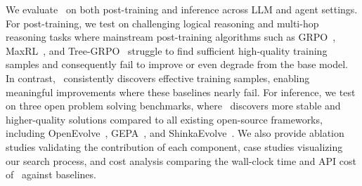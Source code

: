 We evaluate \ours\ on both post-training and inference across LLM and agent settings. For post-training, we test on challenging logical reasoning and multi-hop reasoning tasks where mainstream post-training algorithms such as GRPO~\citep{dsr1}, MaxRL~\citep{maxrl}, and Tree-GRPO~\citep{treegrpo} struggle to find sufficient high-quality training samples and consequently fail to improve or even degrade from the base model. In contrast, \ours\ consistently discovers effective training samples, enabling meaningful improvements where these baselines nearly fail. For inference, we test on three open problem solving benchmarks, where \ours\ discovers more stable and higher-quality solutions compared to all existing open-source frameworks, including OpenEvolve~\citep{openevolve}, GEPA~\citep{gepa}, and ShinkaEvolve~\citep{shinkaevolve}. We also provide ablation studies validating the contribution of each component, case studies visualizing our search process, and cost analysis comparing the wall-clock time and API cost of \ours\ against baselines.
